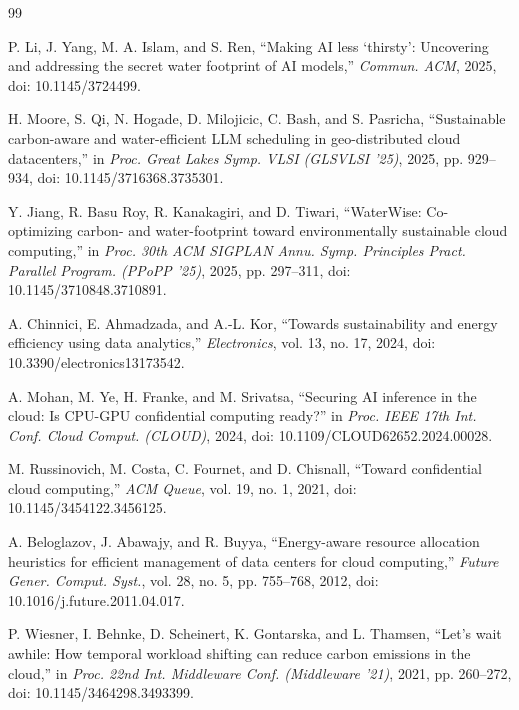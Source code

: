 \documentclass[conference]{IEEEtran}
\begin{document}
\begin{thebibliography}{99}

 P. Li, J. Yang, M. A. Islam, and S. Ren, ``Making AI less `thirsty': Uncovering and addressing the secret water footprint of AI models,'' \textit{Commun. ACM}, 2025, doi: 10.1145/3724499.

 H. Moore, S. Qi, N. Hogade, D. Milojicic, C. Bash, and S. Pasricha, ``Sustainable carbon-aware and water-efficient LLM scheduling in geo-distributed cloud datacenters,'' in \textit{Proc. Great Lakes Symp. VLSI (GLSVLSI '25)}, 2025, pp. 929--934, doi: 10.1145/3716368.3735301.

 Y. Jiang, R. Basu Roy, R. Kanakagiri, and D. Tiwari, ``WaterWise: Co-optimizing carbon- and water-footprint toward environmentally sustainable cloud computing,'' in \textit{Proc. 30th ACM SIGPLAN Annu. Symp. Principles Pract. Parallel Program. (PPoPP '25)}, 2025, pp. 297--311, doi: 10.1145/3710848.3710891.

 A. Chinnici, E. Ahmadzada, and A.-L. Kor, ``Towards sustainability and energy efficiency using data analytics,'' \textit{Electronics}, vol. 13, no. 17, 2024, doi: 10.3390/electronics13173542.

 A. Mohan, M. Ye, H. Franke, and M. Srivatsa, ``Securing AI inference in the cloud: Is CPU-GPU confidential computing ready?'' in \textit{Proc. IEEE 17th Int. Conf. Cloud Comput. (CLOUD)}, 2024, doi: 10.1109/CLOUD62652.2024.00028.

 M. Russinovich, M. Costa, C. Fournet, and D. Chisnall, ``Toward confidential cloud computing,'' \textit{ACM Queue}, vol. 19, no. 1, 2021, doi: 10.1145/3454122.3456125.

 A. Beloglazov, J. Abawajy, and R. Buyya, ``Energy-aware resource allocation heuristics for efficient management of data centers for cloud computing,'' \textit{Future Gener. Comput. Syst.}, vol. 28, no. 5, pp. 755--768, 2012, doi: 10.1016/j.future.2011.04.017.

 P. Wiesner, I. Behnke, D. Scheinert, K. Gontarska, and L. Thamsen, ``Let's wait awhile: How temporal workload shifting can reduce carbon emissions in the cloud,'' in \textit{Proc. 22nd Int. Middleware Conf. (Middleware '21)}, 2021, pp. 260--272, doi: 10.1145/3464298.3493399.


\end{thebibliography}
\end{document}

